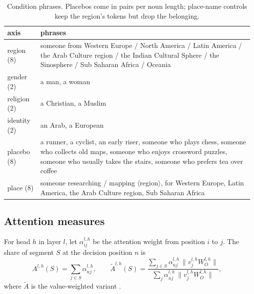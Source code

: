 \begin{table}[t]
  \centering
  \small
  \caption{Condition phrases. Placebos come in pairs per noun length; place-name
    controls keep the region's tokens but drop the belonging.}
  \label{tab:conditions}
  \begin{tabularx}{\linewidth}{lX}
    \toprule
    axis & phrases \\
    \midrule
    region (8)   & someone from Western Europe / North America / Latin America / the Arab Culture region /
                   the Indian Cultural Sphere / the Sinosphere / Sub Saharan Africa / Oceania \\
    gender (2)   & a man, a woman \\
    religion (2) & a Christian, a Muslim \\
    identity (2) & an Arab, a European \\
    \midrule
    placebo (8)  & a runner, a cyclist, an early riser, someone who plays chess, someone who collects
                   old maps, someone who enjoys crossword puzzles, someone who usually takes the stairs,
                   someone who prefers tea over coffee \\
    \midrule
    place (8)    & someone researching / mapping $\langle$region$\rangle$, for Western Europe, Latin America,
                   the Arab Culture region, Sub Saharan Africa \\
    \bottomrule
  \end{tabularx}
\end{table}

\subsection{Attention measures}
\label{sec:method:attention}
For head $h$ in layer $l$, let $\alpha^{l,h}_{ij}$ be the attention weight from
position $i$ to $j$. The share of segment $S$ at the decision position $n$ is
\begin{equation}
  A^{l,h}(S) = \sum_{j \in S} \alpha^{l,h}_{nj},
  \qquad
  \tilde A^{l,h}(S) = \frac{\sum_{j\in S} \alpha^{l,h}_{nj}\,\lVert v^{l,h}_j W^{l,h}_O\rVert}
                           {\sum_{j} \alpha^{l,h}_{nj}\,\lVert v^{l,h}_j W^{l,h}_O\rVert},
  \label{eq:attention}
\end{equation}
where $\tilde A$ is the value-weighted variant \citep{kobayashi2020attention}.

